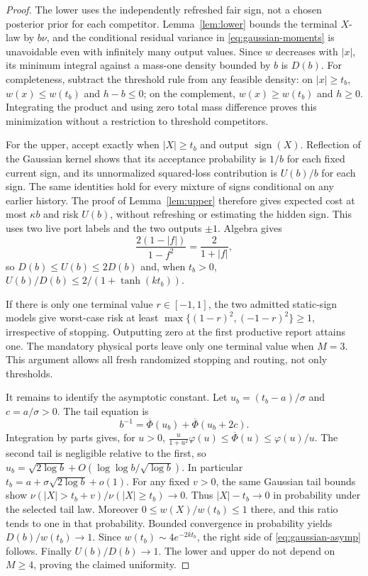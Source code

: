 \begin{proof}
The lower uses the independently refreshed fair sign, not a chosen posterior prior for each competitor. Lemma~\ref{lem:lower} bounds the terminal $X$-law by $b\nu$, and the conditional residual variance in \eqref{eq:gaussian-moments} is unavoidable even with infinitely many output values. Since $w$ decreases with $|x|$, its minimum integral against a mass-one density bounded by $b$ is $D(b)$. For completeness, subtract the threshold rule from any feasible density: on $|x|\ge t_b$, $w(x)\le w(t_b)$ and $h-b\le0$; on the complement, $w(x)\ge w(t_b)$ and $h\ge0$. Integrating the product and using zero total mass difference proves this minimization without a restriction to threshold competitors.

For the upper, accept exactly when $|X|\ge t_b$ and output $\operatorname{sign}(X)$. Reflection of the Gaussian kernel shows that its acceptance probability is $1/b$ for each fixed current sign, and its unnormalized squared-loss contribution is $U(b)/b$ for each sign. The same identities hold for every mixture of signs conditional on any earlier history. The proof of Lemma~\ref{lem:upper} therefore gives expected cost at most $\kappa b$ and risk $U(b)$, without refreshing or estimating the hidden sign. This uses two live port labels and the two outputs $\pm1$. Algebra gives
\[
 \frac{2(1-|f|)}{1-f^2}=\frac2{1+|f|},
\]
so $D(b)\le U(b)\le2D(b)$ and, when $t_b>0$,
$U(b)/D(b)\le2/(1+\tanh(kt_b))$.

If there is only one terminal value $r\in[-1,1]$, the two admitted static-sign models give worst-case risk at least
$\max\{(1-r)^2,(-1-r)^2\}\ge1$, irrespective of stopping. Outputting zero at the first productive report attains one. The mandatory physical ports leave only one terminal value when $M=3$. This argument allows all fresh randomized stopping and routing, not only thresholds.

It remains to identify the asymptotic constant. Let $u_b=(t_b-a)/\sigma$ and $c=a/\sigma>0$. The tail equation is
\[
 b^{-1}=\overline\Phi(u_b)+\overline\Phi(u_b+2c).
\]
Integration by parts gives, for $u>0$,
$\frac{u}{1+u^2}\varphi(u)\le\overline\Phi(u)\le\varphi(u)/u$.
The second tail is negligible relative to the first, so
$u_b=\sqrt{2\log b}+O(\log\log b/\sqrt{\log b})$.
In particular $t_b=a+\sigma\sqrt{2\log b}+o(1)$. For any fixed $v>0$, the same Gaussian tail bounds show
$\nu(|X|>t_b+v)/\nu(|X|\ge t_b)\to0$. Thus $|X|-t_b\to0$ in probability under the selected tail law. Moreover
$0\le w(X)/w(t_b)\le1$ there, and this ratio tends to one in that probability. Bounded convergence in probability yields $D(b)/w(t_b)\to1$. Since $w(t_b)\sim4e^{-2kt_b}$, the right side of \eqref{eq:gaussian-asymp} follows. Finally $U(b)/D(b)\to1$. The lower and upper do not depend on $M\ge4$, proving the claimed uniformity.
\end{proof}

